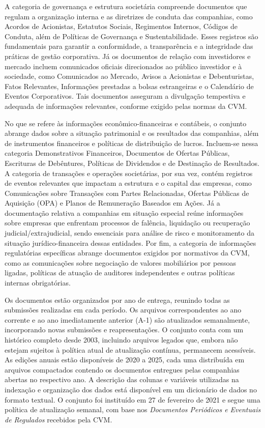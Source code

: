 \documentclass[recuosum=1.5cm]{iftex2024}
\begin{document}
A categoria de governança e estrutura societária compreende documentos que regulam a organização interna e as diretrizes de conduta das companhias, como Acordos de Acionistas, Estatutos Sociais, Regimentos Internos, Códigos de Conduta, além de Políticas de Governança e Sustentabilidade. Esses registros são fundamentais para garantir a conformidade, a transparência e a integridade das práticas de gestão corporativa. Já os documentos de relação com investidores e mercado incluem comunicados oficiais direcionados ao público investidor e à sociedade, como Comunicados ao Mercado, Avisos a Acionistas e Debenturistas, Fatos Relevantes, Informações prestadas a bolsas estrangeiras e o Calendário de Eventos Corporativos. Tais documentos asseguram a divulgação tempestiva e adequada de informações relevantes, conforme exigido pelas normas da CVM.

No que se refere às informações econômico-financeiras e contábeis, o conjunto abrange dados sobre a situação patrimonial e os resultados das companhias, além de instrumentos financeiros e políticas de distribuição de lucros. Incluem-se nessa categoria Demonstrativos Financeiros, Documentos de Ofertas Públicas, Escrituras de Debêntures, Políticas de Dividendos e de Destinação de Resultados. A categoria de transações e operações societárias, por sua vez, contém registros de eventos relevantes que impactam a estrutura e o capital das empresas, como Comunicações sobre Transações com Partes Relacionadas, Ofertas Públicas de Aquisição (OPA) e Planos de Remuneração Baseados em Ações. Já a documentação relativa a companhias em situação especial reúne informações sobre empresas que enfrentam processos de falência, liquidação ou recuperação judicial/extrajudicial, sendo essenciais para análise de risco e monitoramento da situação jurídico-financeira dessas entidades. Por fim, a categoria de informações regulatórias específicas abrange documentos exigidos por normativos da CVM, como as comunicações sobre negociação de valores mobiliários por pessoas ligadas, políticas de atuação de auditores independentes e outras políticas internas obrigatórias.

Os documentos estão organizados por ano de entrega, reunindo todas as submissões realizadas em cada período. Os arquivos correspondentes ao ano corrente e ao ano imediatamente anterior (A-1) são atualizados semanalmente, incorporando novas submissões e reapresentações. O conjunto conta com um histórico completo desde 2003, incluindo arquivos legados que, embora não estejam sujeitos à política atual de atualização contínua, permanecem acessíveis. As edições anuais estão disponíveis de 2020 a 2025, cada uma distribuída em arquivos compactados contendo os documentos entregues pelas companhias abertas no respectivo ano. A descrição das colunas e variáveis utilizadas na indexação e organização dos dados está disponível em um dicionário de dados no formato textual. O conjunto foi instituído em 27 de fevereiro de 2021 e segue uma política de atualização semanal, com base nos \textit{Documentos Periódicos e Eventuais de Regulados} recebidos pela CVM.
\end{document}
